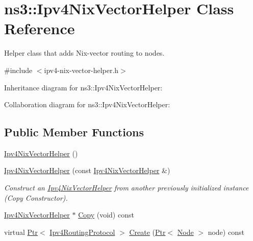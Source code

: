 \hypertarget{classns3_1_1Ipv4NixVectorHelper}{}\section{ns3\+:\+:Ipv4\+Nix\+Vector\+Helper Class Reference}
\label{classns3_1_1Ipv4NixVectorHelper}


Helper class that adds Nix-\/vector routing to nodes.  




{\ttfamily \#include $<$ipv4-\/nix-\/vector-\/helper.\+h$>$}



Inheritance diagram for ns3\+:\+:Ipv4\+Nix\+Vector\+Helper\+:


Collaboration diagram for ns3\+:\+:Ipv4\+Nix\+Vector\+Helper\+:
\subsection*{Public Member Functions}
\begin{DoxyCompactItemize}
\item 
\hyperlink{classns3_1_1Ipv4NixVectorHelper_a37ddebb3efea0e65c451feb3b00b95cc}{Ipv4\+Nix\+Vector\+Helper} ()
\item 
\hyperlink{classns3_1_1Ipv4NixVectorHelper_a0f9743ff98888977af5a2df146e1f75f}{Ipv4\+Nix\+Vector\+Helper} (const \hyperlink{classns3_1_1Ipv4NixVectorHelper}{Ipv4\+Nix\+Vector\+Helper} \&)
\begin{DoxyCompactList}\small\item\em Construct an \hyperlink{classns3_1_1Ipv4NixVectorHelper}{Ipv4\+Nix\+Vector\+Helper} from another previously initialized instance (Copy Constructor). \end{DoxyCompactList}\item 
\hyperlink{classns3_1_1Ipv4NixVectorHelper}{Ipv4\+Nix\+Vector\+Helper} $\ast$ \hyperlink{classns3_1_1Ipv4NixVectorHelper_a7c0df9f3d269dedeb235232f510f7e11}{Copy} (void) const 
\item 
virtual \hyperlink{classns3_1_1Ptr}{Ptr}$<$ \hyperlink{classns3_1_1Ipv4RoutingProtocol}{Ipv4\+Routing\+Protocol} $>$ \hyperlink{classns3_1_1Ipv4NixVectorHelper_a803ebba1b96868068ae0c23b26ae0325}{Create} (\hyperlink{classns3_1_1Ptr}{Ptr}$<$ \hyperlink{classns3_1_1Node}{Node} $>$ node) const 
\end{DoxyCompactItemize}
